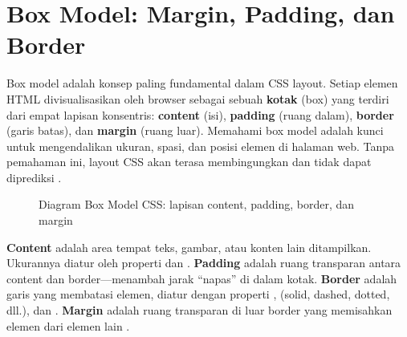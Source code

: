 ﻿\section{Box Model: Margin, Padding, dan Border}

Box model adalah konsep paling fundamental dalam CSS layout. Setiap elemen HTML divisualisasikan oleh browser sebagai sebuah \textbf{kotak} (box) yang terdiri dari empat lapisan konsentris: \textbf{content} (isi), \textbf{padding} (ruang dalam), \textbf{border} (garis batas), dan \textbf{margin} (ruang luar). Memahami box model adalah kunci untuk mengendalikan ukuran, spasi, dan posisi elemen di halaman web. Tanpa pemahaman ini, layout CSS akan terasa membingungkan dan tidak dapat diprediksi \cite{webdevCss}.

\begin{figure}[H]
\centering
{}
\caption{Diagram Box Model CSS: lapisan content, padding, border, dan margin}
\end{figure}

\textbf{Content} adalah area tempat teks, gambar, atau konten lain ditampilkan. Ukurannya diatur oleh properti  dan . \textbf{Padding} adalah ruang transparan antara content dan border---menambah jarak ``napas'' di dalam kotak. \textbf{Border} adalah garis yang membatasi elemen, diatur dengan properti ,  (solid, dashed, dotted, dll.), dan . \textbf{Margin} adalah ruang transparan di luar border yang memisahkan elemen dari elemen lain \cite{mdnCss}.

